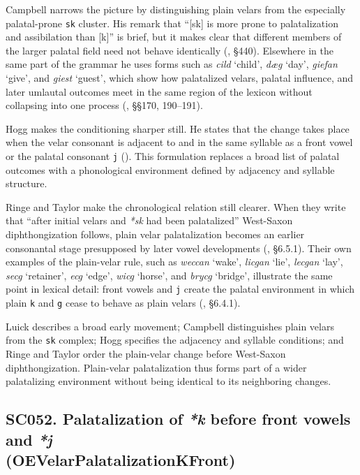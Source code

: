 \documentclass[
  british,
  a4paper,
  openany]{book}
\providecommand{\texorpdfstring}[2]{#1}
\DeclareRobustCommand{\CAPRRuleHeading}[2]{%
  #1\texorpdfstring{\\(#2)}{ (#2)}%
}
\begin{document}
Campbell narrows the picture by distinguishing plain velars from the
especially palatal-prone \texttt{sk} cluster. His remark that ``{[}sk{]}
is more prone to palatalization and assibilation than {[}k{]}'' is
brief, but it makes clear that different members of the larger palatal
field need not behave identically (, §440). Elsewhere in the same part of the grammar he uses
forms such as \emph{cild} `child', \emph{dæg} `day', \emph{giefan}
`give', and \emph{giest} `guest', which show how palatalized velars,
palatal influence, and later umlautal outcomes meet in the same region
of the lexicon without collapsing into one process
(, §§170,
190--191).

Hogg makes the conditioning sharper still. He states that the change
takes place when the velar consonant is adjacent to and in the same
syllable as a front vowel or the palatal consonant \texttt{j}
(). This formulation replaces
a broad list of palatal outcomes with a phonological environment defined
by adjacency and syllable structure.

Ringe and Taylor make the chronological relation still clearer. When
they write that ``after initial velars and \emph{*sk} had been
palatalized'' West-Saxon diphthongization follows, plain velar
palatalization becomes an earlier consonantal stage presupposed by later
vowel developments (, §6.5.1). Their own examples of the plain-velar rule, such as
\emph{weccan} `wake', \emph{licgan} `lie', \emph{lecgan} `lay',
\emph{secg} `retainer', \emph{ecg} `edge', \emph{wicg} `horse', and
\emph{brycg} `bridge', illustrate the same point in lexical detail:
front vowels and \texttt{j} create the palatal environment in which
plain \texttt{k} and \texttt{g} cease to behave as plain velars
(,
§6.4.1).

Luick describes a broad early movement; Campbell distinguishes plain
velars from the \texttt{sk} complex; Hogg specifies the adjacency and
syllable conditions; and Ringe and Taylor order the plain-velar change
before West-Saxon diphthongization. Plain-velar palatalization thus
forms part of a wider palatalizing environment without being identical
to its neighboring changes.

\subsection{\texorpdfstring{\CAPRRuleHeading{SC052. Palatalization of \emph{*k} before front vowels and \emph{*j}}{OEVelarPalatalizationKFront}}{}}\label{rule-OEVelarPalatalizationKFront}
\end{document}
